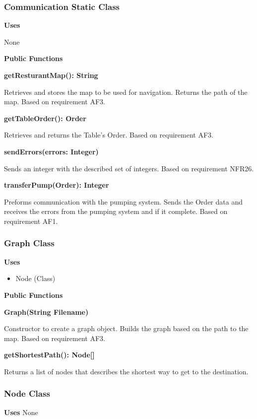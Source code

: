 \documentclass [10pt]{article}
\begin{document}
\subsubsection{Communication Static Class}
\textbf{Uses}

None 

\textbf{Public Functions}

\textbf{getResturantMap(): String}

Retrieves and stores the map to be used for navigation. Returns the path of the map. Based on requirement AF3.

\textbf{getTableOrder(): Order}

Retrieves and returns the Table's Order. Based on requirement AF3.

\textbf{sendErrors(errors: Integer)}

Sends an integer with the described set of integers. Based on requirement NFR26.

\textbf{transferPump(Order): Integer}

Preforms communication with the pumping system. Sends the Order data and receives the errors from the pumping system and if it complete. Based on requirement AF1.


\subsubsection{Graph Class}
\textbf{Uses}
\begin{itemize}
	\item Node (Class)
\end{itemize}

\textbf{Public Functions}

\textbf{Graph(String Filename)}

Constructor to create a graph object. Builds the graph based on the path to the map. Based on requirement AF3.

\textbf{getShortestPath(): Node[]}

Returns a list of nodes that describes the shortest way to get to the destination. 


\subsubsection{Node Class}
\textbf{Uses}
None 
\end{document}
